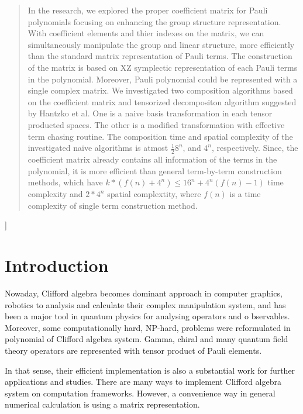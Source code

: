 \documentclass[twocolumn]{article}
\begin{document}
\begin{@twocolumnfalse}
\begin{center}
\begin{abstract}
In the research, we explored the proper coefficient 
matrix for Pauli polynomials focusing on enhancing the 
group structure representation. 
With coefficient elements and thier indexes on the matrix,
we can simultaneously manipulate the group and linear structure,
more efficiently than the standard matrix representation of Pauli terms.
The construction of the matrix is based on XZ symplectic representation of 
each Pauli terms in the polynomial. 
Moreover, Pauli polynomial could be represented with a single complex matrix.
We investigated two composition algorithms based on the coefficient matrix and 
tensorized decompositon algorithm suggested by Hantzko et al\cite{hantzko_tensorized_2023}.
One is a naive basis transformation in each tensor producted spaces.
The other is a modified transformation with effective term chasing routine.
The composition time and spatial complexity 
of the investigated naive algorithms is atmost $\frac{1}{2}8^n$, and $4^n$, respectively.
Since, the coefficient matrix already contains all information of the terms
in the polynomial, it is more efficient than general term-by-term construction methods, which have 
$k*(f(n)+4^n)\leq 16^n + 4^n(f(n)-1)$ time complexity and $2*4^n$ spatial complextity, where $f(n)$ is a time complexity of 
single term construction method.
\end{abstract}

    \end{center}
\end{@twocolumnfalse}
]

    

\section{Introduction}

Nowaday, Clifford algebra becomes dominant approach in 
computer graphics, robotics to analysis and calculate their complex manipulation system,
and has been a major tool in quantum physics for analysing operators and o bservables.
Moreover, some computationally hard, NP-hard, problems were reformulated 
in polynomial of Clifford algebra system.
Gamma, chiral and many quantum field theory operators are represented
with tensor product of Pauli elements. %

In that sense, their efficient implementation is also a substantial 
work for further applications and studies.
There are many ways to implement Clifford algebra system 
on computation frameworks\cite{dorst_symbolic_2002, aragoncamarasa2018cliffordalgebramathematica}.
However, a convenience way in general numerical calculation is using a matrix representation.
\end{document}
